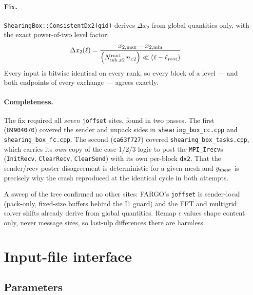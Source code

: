\documentclass[11pt]{article}
\newcommand{\code}[1]{\texttt{#1}}
\newcommand{\file}[1]{\texttt{\small #1}}
\newcommand{\fn}[1]{\texttt{\small #1}}
\begin{document}
\paragraph{Fix.} \fn{ShearingBox::ConsistentDx2(gid)} derives $\Delta x_2$ from global
quantities only, with the exact power-of-two level factor:
\begin{equation}
  \Delta x_2(\ell) = \frac{x_{2,\max} - x_{2,\min}}
                          {\left(N^{\rm root}_{{\rm mb},x2}\, n_{x2}\right)
                           \ll (\ell - \ell_{\rm root})} .
\end{equation}
Every input is bitwise identical on every rank, so every block of a level --- and both
endpoints of every exchange --- agrees exactly.

\paragraph{Completeness.} The fix required all \emph{seven} \code{joffset} sites,
found in two passes. The first (\code{89904070}) covered the sender and unpack sides
in \file{shearing\_box\_cc.cpp} and \file{shearing\_box\_fc.cpp}. The second
(\code{ca63f727}) covered \file{shearing\_box\_tasks.cpp}, which carries its
\emph{own} copy of the case-1/2/3 logic to post the \code{MPI\_Irecv}s
(\fn{InitRecv}, \fn{ClearRecv}, \fn{ClearSend}) with its own per-block \code{dx2}.
That the sender/recv-poster disagreement is deterministic for a given mesh and
$y_{\rm shear}$ is precisely why the crash reproduced at the identical cycle in both
attempts.

A sweep of the tree confirmed no other sites: FARGO's \code{joffset} is sender-local
(pack-only, fixed-size buffers behind the I1 guard) and the FFT and multigrid solver
shifts already derive from global quantities. Remap $\epsilon$ values shape content
only, never message sizes, so last-ulp differences there are harmless.

\section{Input-file interface}
\label{sec:inputs}

\subsection{Parameters}
\end{document}
